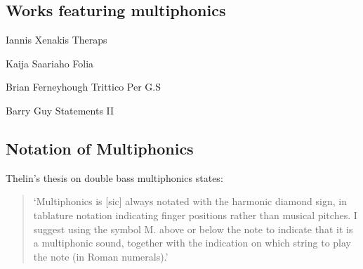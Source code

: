 \subsection{Works featuring multiphonics}
Iannis Xenakis Theraps

Kaija Saariaho Folia

Brian Ferneyhough Trittico Per G.S

Barry Guy Statements II

\subsection{Notation of Multiphonics}

Thelin's thesis on double bass multiphonics states:
\begin{quotation}
    `Multiphonics is [sic] always notated with the harmonic diamond sign, in tablature notation
indicating finger positions rather than musical pitches. I suggest using the symbol M. above or
below the note to indicate that it is a multiphonic sound, together with the indication on which
string to play the note (in Roman numerals).'\autocite[6]{thelinMultiphonicsDoubleBass2011}
\end{quotation}

